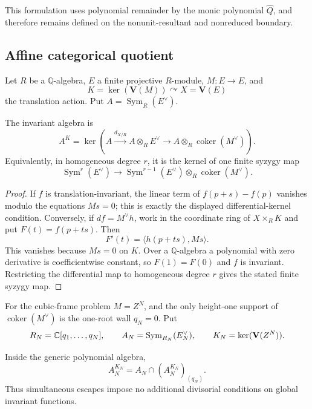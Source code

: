 This formulation uses polynomial remainder by the monic polynomial
\(\widehat Q\), and therefore remains defined on the nonunit-resultant and
nonreduced boundary.

\subsection{Affine categorical quotient}

Let \(R\) be a \(\mathbb Q\)-algebra, \(E\) a finite projective \(R\)-module,
\(M\colon E\to E\), and
\[
K=\ker(\mathbf V(M))\curvearrowright X=\mathbf V(E)
\]
the translation action.  Put \(A=\operatorname{Sym}_R(E^\vee)\).

\begin{theorem}
\label{thm:categorical-differential-kernel}
The invariant algebra is
\[
A^K=\ker\left(
A\xrightarrow{d_{X/R}}
A\otimes_R E^\vee
\longrightarrow
A\otimes_R\operatorname{coker}(M^\vee)
\right).
\]
Equivalently, in homogeneous degree \(r\), it is the kernel of one finite
syzygy map
\[
\operatorname{Sym}^r(E^\vee)\longrightarrow
\operatorname{Sym}^{r-1}(E^\vee)\otimes_R\operatorname{coker}(M^\vee).
\]
\end{theorem}

\begin{proof}
If \(f\) is translation-invariant, the linear term of
\(f(p+s)-f(p)\) vanishes modulo the equations \(Ms=0\); this is exactly the
displayed differential-kernel condition.  Conversely, if
\(df=M^\vee h\), work in the coordinate ring of \(X\times_RK\) and put
\(F(t)=f(p+ts)\).  Then
\[
F'(t)=\langle h(p+ts),Ms\rangle.
\]
This vanishes because \(Ms=0\) on \(K\).  Over a \(\mathbb Q\)-algebra a
polynomial with zero derivative is coefficientwise constant, so
\(F(1)=F(0)\) and \(f\) is invariant.  Restricting the differential map to
homogeneous degree \(r\) gives the stated finite syzygy map.
\end{proof}

For the cubic-frame problem \(M=Z^N\), and the only height-one support of
\(\operatorname{coker}(M^\vee)\) is the one-root wall \(q_N=0\).
Put
\[
R_N=\mathbb C[q_1,\ldots,q_N],\qquad
A_N=\operatorname{Sym}_{R_N}(E_N^\vee),\qquad
K_N=\ker(\mathbf V(Z^N)).
\]

\begin{theorem}
\label{thm:one-wall-control}
Inside the generic polynomial algebra,
\[
A_N^{K_N}
=
A_N\cap (A_N^{K_N})_{(q_N)}.
\]
Thus simultaneous escapes impose no additional divisorial conditions on
global invariant functions.
\end{theorem}

